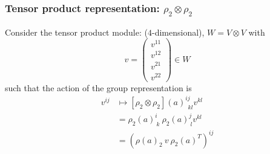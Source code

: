 \begin{enumerate}
\subsubsection{Tensor product representation: $\rho_2\otimes\rho_2$}
Consider the tensor product module: ($4$-dimensional), $W = V\otimes V$ with 
\begin{equation}
    v = \begin{pmatrix}
        v^{11}\\
        v^{12}\\
        v^{21}\\
        v^{22}
    \end{pmatrix}\in W
\end{equation}
such that the action of the group representation is
\begin{equation}
    \begin{split}
        v^{ij}&\mapsto[\rho_2\otimes\rho_2](a)^{ij}_{\ \ kl}v^{kl}\\
         &= \rho_2(a)^i_{\ k}\ \rho_2(a)^j_{\ l}v^{kl}\\ 
         &= (\rho(a)_2 \ v \ \rho_2(a)^T)^{ij}
    \end{split}
\end{equation}


\end{enumerate}

